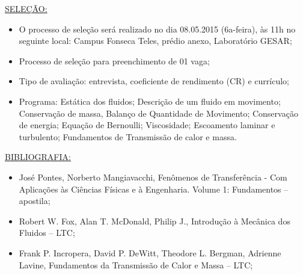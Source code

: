 \documentclass[a4paper,portuguese,12pt]{article}
\begin{document}
\underline{SELEÇÃO:}
\begin{itemize}
	\item O processo de seleção será realizado no dia 08.05.2015
	(6a-feira), às 11h no seguinte local: Campus Fonseca Teles, prédio
	anexo, Laboratório GESAR;
	\item Processo de seleção para preenchimento de 01 vaga;
	\item Tipo de avaliação: entrevista, coeficiente de rendimento (CR)
	e currículo;
	\item Programa: Estática dos fluidos; Descrição de um fluido em
	movimento; Conservação de massa, Balanço de Quantidade de
	Movimento; Conservação de energia; Equação de Bernoulli;
	Viscosidade; Escoamento laminar e turbulento; Fundamentos de
	Transmissão de calor e massa.
\end{itemize}

\underline{BIBLIOGRAFIA:}
\begin{itemize}
	\item José Pontes,  Norberto Mangiavacchi, Fenômenos de
	Transferência - Com Aplicações às Ciências Físicas e à Engenharia.
	Volume 1: Fundamentos -- apostila;
	\item Robert W. Fox, Alan T. McDonald, Philip J., Introdução à
	Mecânica dos Fluidos -- LTC;
	\item Frank P. Incropera, David P. DeWitt, Theodore L. Bergman,
	Adrienne Lavine, Fundamentos da Transmissão de Calor e Massa – LTC;
\end{itemize}
\end{document}
